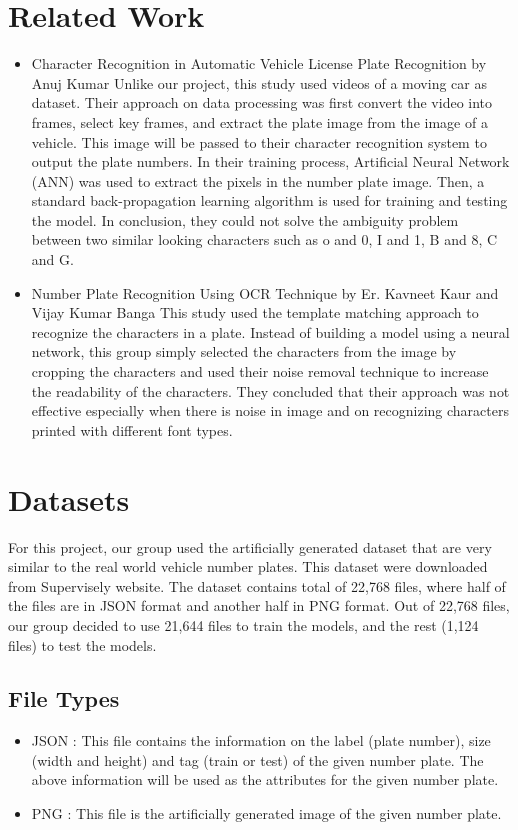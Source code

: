 \documentclass[conference]{IEEEtran}
\begin{document}
\section{Related Work}
\begin{itemize}
\item Character Recognition in Automatic Vehicle License Plate Recognition by Anuj Kumar \cite{b3} Unlike our project, this study used videos of a moving car as dataset. Their approach on data processing was first convert the video into frames, select key frames, and extract the plate image from the image of a vehicle. This image will be passed to their character recognition system to output the plate numbers. In their training process, Artificial Neural Network (ANN) was used to extract the pixels in the number plate image. Then, a standard back-propagation learning algorithm is used for training and testing the model. In conclusion, they could not solve the ambiguity problem between two similar looking characters such as o and 0, I and 1, B and 8, C and G.
\item Number Plate Recognition Using OCR Technique by Er. Kavneet Kaur and Vijay Kumar Banga \cite{b4} This study used the template matching approach to recognize the characters in a plate. Instead of building a model using a neural network, this group simply selected the characters from the image by cropping the characters and used their noise removal technique to increase the readability of the characters. They concluded that their approach was not effective especially when there is noise in image and on recognizing characters printed with different font types.
\end{itemize}

\section{Datasets}
For this project, our group used the artificially generated dataset that are very similar to the real world vehicle number plates. This dataset were downloaded from Supervisely website. The dataset contains total of 22,768 files, where half of the files are in JSON format and another half in PNG format. Out of 22,768 files, our group decided to use 21,644 files to train the models, and the rest (1,124 files) to test the models.

\subsection{File Types}
\begin{itemize}
\item JSON : This file contains the information on the label (plate number), size (width and height) and tag (train or test) of the given number plate. The above information will be used as the attributes for the given number plate.
\item PNG : This file is the artificially generated image of the given number plate.
\end{itemize}
\end{document}
